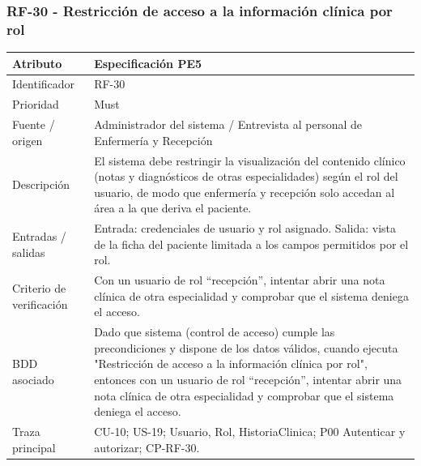 \documentclass[11pt,a4paper]{article}
\begin{document}
	\subsubsection{RF-30 - Restricción de acceso a la información clínica por rol}
	\begin{tabularx}{\textwidth}{p{3.2cm}Y}
		\toprule
		\textbf{Atributo} & \textbf{Especificación PE5}\\\midrule
		Identificador & RF-30\\
		Prioridad & Must\\
		Fuente / origen & Administrador del sistema / Entrevista al personal de Enfermería y Recepción\\
		Descripción & El sistema debe restringir la visualización del contenido clínico (notas y diagnósticos de otras especialidades) según el rol del usuario, de modo que enfermería y recepción solo accedan al área a la que deriva el paciente.\\
		Entradas / salidas & Entrada: credenciales de usuario y rol asignado. Salida: vista de la ficha del paciente limitada a los campos permitidos por el rol.\\
		Criterio de verificación & Con un usuario de rol “recepción”, intentar abrir una nota clínica de otra especialidad y comprobar que el sistema deniega el acceso.\\
		BDD asociado & Dado que sistema (control de acceso) cumple las precondiciones y dispone de los datos válidos, cuando ejecuta "Restricción de acceso a la información clínica por rol", entonces con un usuario de rol “recepción”, intentar abrir una nota clínica de otra especialidad y comprobar que el sistema deniega el acceso.\\
		Traza principal & CU-10; US-19; Usuario, Rol, HistoriaClinica; P00 Autenticar y autorizar; CP-RF-30.\\
		\bottomrule
	\end{tabularx}
	\clearpage
\end{document}
